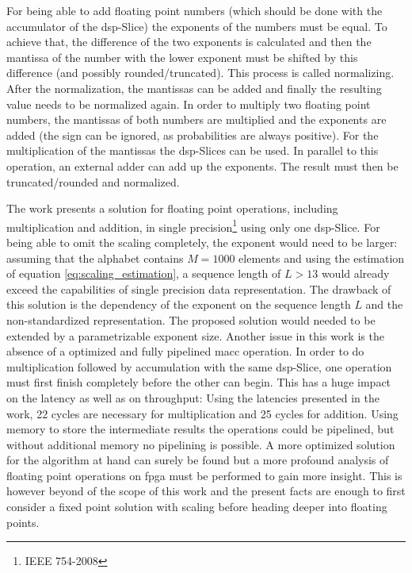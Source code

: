 \documentclass[mscthesis]{usiinfthesis}
\begin{document}
For being able to add floating point numbers (which should be done with the
accumulator of the \gls{dsp}-Slice) the exponents of the numbers must be equal.
To achieve that, the difference of the two exponents is calculated and then the
mantissa of the number with the lower exponent must be shifted by this
difference (and possibly rounded/truncated). This process is called
normalizing. After the normalization, the mantissas can be added and finally
the resulting value needs to be normalized again. In order to multiply two
floating point numbers, the mantissas of both numbers are multiplied and the
exponents are added (the sign can be ignored, as probabilities are always
positive). For the multiplication of the mantissas the \gls{dsp}-Slices can be
used. In parallel to this operation, an external adder can add up the
exponents. The result must then be truncated/rounded and normalized.

The work \cite{FPL13_Brosser} presents a solution for floating point
operations, including multiplication and addition, in single
precision\footnote{IEEE 754-2008} using only one \gls{dsp}-Slice. For being able to
omit the scaling completely, the exponent would need to be larger: assuming
that the alphabet contains $M=1000$ elements and using the estimation of
equation \ref{eq:scaling_estimation}, a sequence length of $L>13$ would already
exceed the capabilities of single precision data representation. The drawback
of this solution is the dependency of the exponent on the sequence length $L$
and the non-standardized representation. The proposed solution would needed to
be extended by a parametrizable exponent size. Another issue in this work is
the absence of a optimized and fully pipelined \gls{macc} operation.
In order to do multiplication followed by accumulation with the same \gls{dsp}-Slice,
one operation must first finish completely before the other can begin. This has
a huge impact on the latency as well as on throughput: Using the latencies
presented in the work, 22 cycles are necessary for multiplication and 25 cycles
for addition. Using memory to store the intermediate results the operations
could be pipelined, but without additional memory no pipelining is possible.
A more optimized solution for the algorithm at hand can surely be found but
a more profound analysis of floating point operations on \gls{fpga} must be performed
to gain more insight. This is however beyond of the scope of this work and the
present facts are enough to first consider a fixed point solution with scaling
before heading deeper into floating points.
\end{document}
